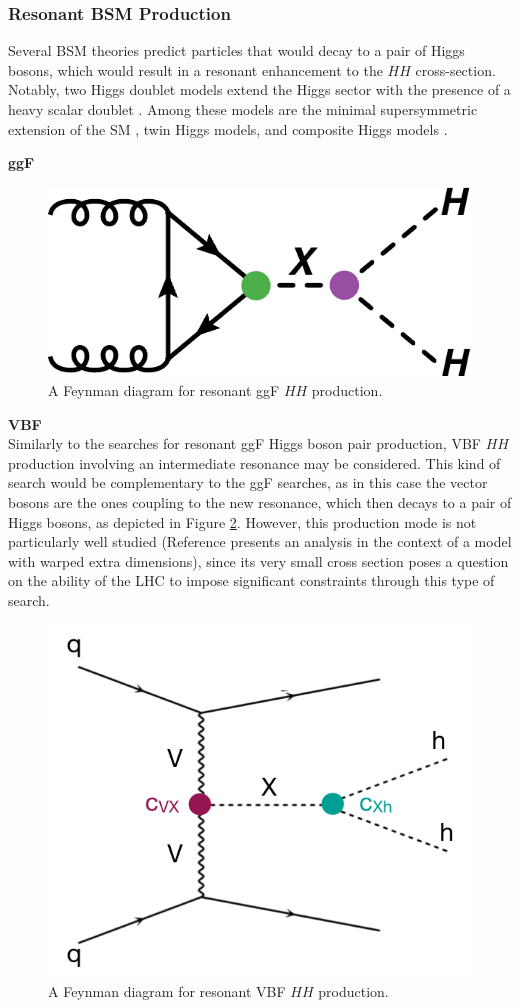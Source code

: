 \subsubsection{Resonant BSM Production}

Several \gls{BSM} theories predict particles that would decay to a pair of Higgs bosons, which would result in a resonant enhancement to the $HH$ cross-section. Notably, two Higgs doublet models extend the Higgs sector with the presence of a heavy scalar doublet \cite{THDM}. Among these models are the minimal supersymmetric extension of the \gls{SM} \cite{mssm}, twin Higgs models, and composite Higgs models \cite{compositeHiggs}.

\noindent\textbf{\gls{ggF}}\\
\indent


\begin{figure}[!ht]
    \centering
    \includegraphics[width=.6\textwidth]{chapters/chapter1_theory/images/hh_res_ggf.pdf}
    \caption{A Feynman diagram for resonant ggF  $HH$ production.}
    \label{fig:ggf-resonant}
\end{figure}

\noindent\textbf{VBF}\\
\indent Similarly to the searches for resonant ggF Higgs boson pair production, \gls{VBF} $HH$
production involving an intermediate resonance may be considered. This kind of search would be complementary to the ggF searches, as in this case the vector bosons are the ones coupling to the new resonance, which then decays to a pair of Higgs bosons, as depicted in Figure \ref{fig:vbf-resonant}. However, this production mode is not
particularly well studied (Reference \cite{res_vbf} presents an analysis in the context of a model with warped extra dimensions), since its very small cross section poses a question on the ability of the LHC to impose significant constraints through this type of search.

\begin{figure}[!ht]
    \centering
    \includegraphics[width=.6\textwidth]{chapters/chapter1_theory/images/vbf_resonant.png}
    \caption{A Feynman diagram for resonant VBF $HH$ production.}
    \label{fig:vbf-resonant}
\end{figure}

